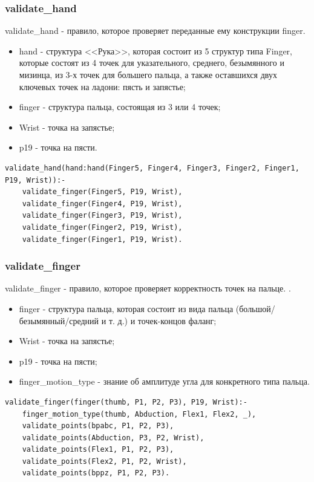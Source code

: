 \subsubsection{validate\_hand}
\hspace{0.6cm} validate\_hand - правило, которое проверяет переданные ему конструкции finger.

\begin{itemize}
	\item hand - структура <<Рука>>, которая состоит из 5 структур типа Finger, которые состоят из 4 точек для указательного, среднего, безымянного и мизинца, из 3-х точек для большего пальца, а также оставшихся двух ключевых точек на ладони: пясть и запястье;
	\item finger - структура пальца, состоящая из 3 или 4 точек;
	\item Wrist - точка на запястье;
	\item p19 - точка на пясти.
\end{itemize}

\begin{lstlisting}[caption=Реализация правила validate\_hand, label=rules:validatehand]
validate_hand(hand:hand(Finger5, Finger4, Finger3, Finger2, Finger1, P19, Wrist)):-
	validate_finger(Finger5, P19, Wrist),
	validate_finger(Finger4, P19, Wrist),
	validate_finger(Finger3, P19, Wrist),
	validate_finger(Finger2, P19, Wrist),
	validate_finger(Finger1, P19, Wrist).
\end{lstlisting}

\subsubsection{validate\_finger}
\hspace{0.6cm} validate\_finger - правило, которое проверяет корректность точек на пальце. .

\begin{itemize}
	\item finger - структура пальца, которая состоит из вида пальца (большой/безымянный/средний и т. д.) и точек-концов фаланг;
	\item Wrist - точка на запястье;
	\item p19 - точка на пясти;
	\item finger\_motion\_type - знание об амплитуде угла для конкретного типа пальца.
\end{itemize}

\begin{lstlisting}[caption=Реализация правила validate\_finger, label=rules:validatefinger]
validate_finger(finger(thumb, P1, P2, P3), P19, Wrist):-
	finger_motion_type(thumb, Abduction, Flex1, Flex2, _),
	validate_points(bpabc, P1, P2, P3),
	validate_points(Abduction, P3, P2, Wrist),
	validate_points(Flex1, P1, P2, P3),
	validate_points(Flex2, P1, P2, Wrist),
	validate_points(bppz, P1, P2, P3).
\end{lstlisting}

